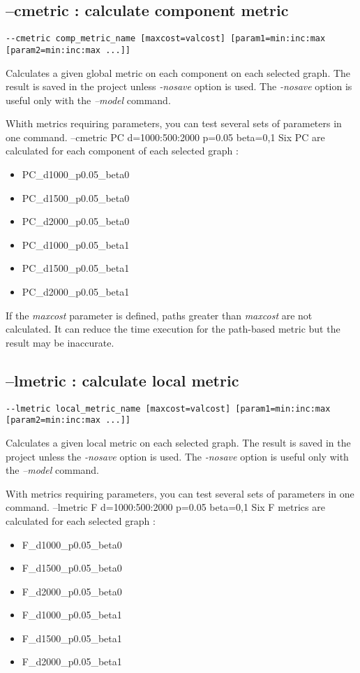 \documentclass[a4paper,10pt]{report}
\newenvironment{cmd}
{\quote\Verbatim}
{\endVerbatim\endquote}
\begin{document}
\subsection{--cmetric : calculate component metric}
\begin{verbatim}
--cmetric comp_metric_name [maxcost=valcost] [param1=min:inc:max [param2=min:inc:max ...]]
\end{verbatim}
Calculates a given global metric on each component on each selected graph.
The result is saved in the project unless \textit{-nosave} option is used. The \textit{-nosave} option is useful only with the \textit{--model} command.

Whith metrics requiring parameters, you can test several sets of parameters in one command.
\begin{cmd}
--cmetric PC d=1000:500:2000 p=0.05 beta=0,1
\end{cmd}
Six PC are calculated for each component of each selected graph :
\begin{itemize}
 \item PC\_d1000\_p0.05\_beta0
 \item PC\_d1500\_p0.05\_beta0
 \item PC\_d2000\_p0.05\_beta0
 \item PC\_d1000\_p0.05\_beta1
 \item PC\_d1500\_p0.05\_beta1
 \item PC\_d2000\_p0.05\_beta1
\end{itemize}


If the \textit{maxcost} parameter is defined, paths greater than \textit{maxcost} are not calculated. It can reduce the time execution for the path-based metric but the result may be inaccurate. 

\subsection{--lmetric : calculate local metric}
\begin{verbatim}
--lmetric local_metric_name [maxcost=valcost] [param1=min:inc:max [param2=min:inc:max ...]] 
\end{verbatim}
Calculates a given local metric on each selected graph.
The result is saved in the project unless the \textit{-nosave} option is used. The \textit{-nosave} option is useful only with the \textit{--model} command.

With metrics requiring parameters, you can test several sets of parameters in one command.
\begin{cmd}
--lmetric F d=1000:500:2000 p=0.05 beta=0,1
\end{cmd}
Six F metrics are calculated for each selected graph :
\begin{itemize}
 \item F\_d1000\_p0.05\_beta0
 \item F\_d1500\_p0.05\_beta0
 \item F\_d2000\_p0.05\_beta0
 \item F\_d1000\_p0.05\_beta1
 \item F\_d1500\_p0.05\_beta1
 \item F\_d2000\_p0.05\_beta1
\end{itemize}
\end{document}
